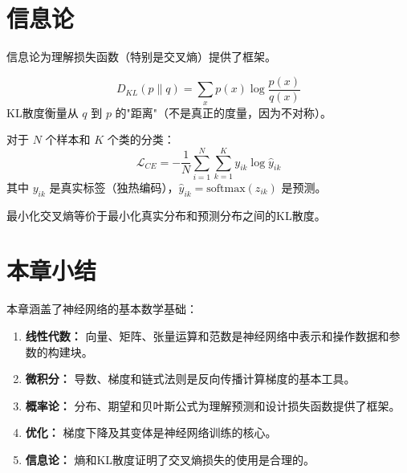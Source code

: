 \section{信息论}

信息论为理解损失函数（特别是交叉熵）提供了框架。

\begin{definition}[KL散度]
\begin{equation}
D_{KL}(p \| q) = \sum_{x} p(x) \log \frac{p(x)}{q(x)}
\end{equation}
KL散度衡量从 $q$ 到 $p$ 的"距离"（不是真正的度量，因为不对称）。
\end{definition}

\begin{example}[交叉熵损失]
对于 $N$ 个样本和 $K$ 个类的分类：
\begin{equation}
\mathcal{L}_{CE} = -\frac{1}{N}\sum_{i=1}^{N}\sum_{k=1}^{K} y_{ik} \log \hat{y}_{ik}
\end{equation}
其中 $y_{ik}$ 是真实标签（独热编码），$\hat{y}_{ik} = \text{softmax}(z_{ik})$ 是预测。

最小化交叉熵等价于最小化真实分布和预测分布之间的KL散度。
\end{example}

\section{本章小结}

本章涵盖了神经网络的基本数学基础：

\begin{enumerate}
    \item \textbf{线性代数：} 向量、矩阵、张量运算和范数是神经网络中表示和操作数据和参数的构建块。
    
    \item \textbf{微积分：} 导数、梯度和链式法则是反向传播计算梯度的基本工具。
    
    \item \textbf{概率论：} 分布、期望和贝叶斯公式为理解预测和设计损失函数提供了框架。
    
    \item \textbf{优化：} 梯度下降及其变体是神经网络训练的核心。
    
    \item \textbf{信息论：} 熵和KL散度证明了交叉熵损失的使用是合理的。
\end{enumerate}
